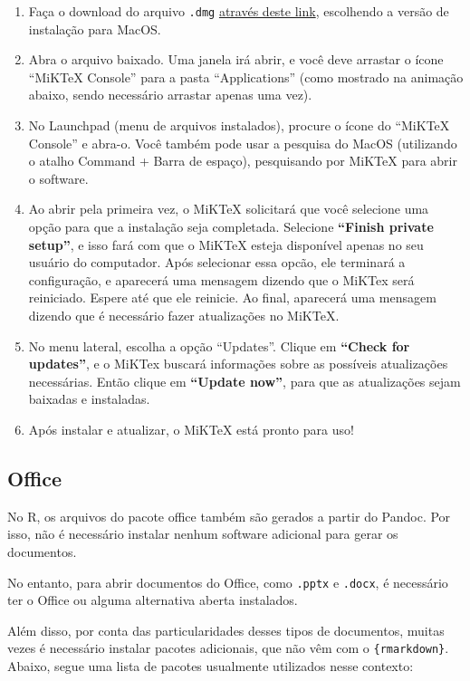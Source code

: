 \documentclass[
]{book}
\begin{document}
\begin{enumerate}
\def\labelenumi{\arabic{enumi}.}
\item
  Faça o download do arquivo \texttt{.dmg} \href{https://miktex.org/download\#mac}{através deste link}, escolhendo a versão de instalação para MacOS.
\item
  Abra o arquivo baixado. Uma janela irá abrir, e você deve arrastar o ícone ``MiKTeX Console'' para a pasta ``Applications'' (como mostrado na animação abaixo, sendo necessário arrastar apenas uma vez).
\item
  No Launchpad (menu de arquivos instalados), procure o ícone do ``MiKTeX Console'' e abra-o. Você também pode usar a pesquisa do MacOS (utilizando o atalho Command + Barra de espaço), pesquisando por MiKTeX para abrir o software.
\item
  Ao abrir pela primeira vez, o MiKTeX solicitará que você selecione uma opção para que a instalação seja completada. Selecione \textbf{``Finish private setup''}, e isso fará com que o MiKTeX esteja disponível apenas no seu usuário do computador. Após selecionar essa opcão, ele terminará a configuração, e aparecerá uma mensagem dizendo que o MiKTex será reiniciado. Espere até que ele reinicie. Ao final, aparecerá uma mensagem dizendo que é necessário fazer atualizações no MiKTeX.
\item
  No menu lateral, escolha a opção ``Updates''. Clique em \textbf{``Check for updates''}, e o MiKTex buscará informações sobre as possíveis atualizações necessárias. Então clique em \textbf{``Update now''}, para que as atualizações sejam baixadas e instaladas.
\item
  Após instalar e atualizar, o MiKTeX está pronto para uso!
\end{enumerate}

\hypertarget{office}{%
\subsection{Office}\label{office}}

No R, os arquivos do pacote office também são gerados a partir do Pandoc. Por isso, não é necessário instalar nenhum software adicional para gerar os documentos.

No entanto, para abrir documentos do Office, como \texttt{.pptx} e \texttt{.docx}, é necessário ter o Office ou alguma alternativa aberta instalados.

Além disso, por conta das particularidades desses tipos de documentos, muitas vezes é necessário instalar pacotes adicionais, que não vêm com o \texttt{\{rmarkdown\}}. Abaixo, segue uma lista de pacotes usualmente utilizados nesse contexto:
\end{document}

